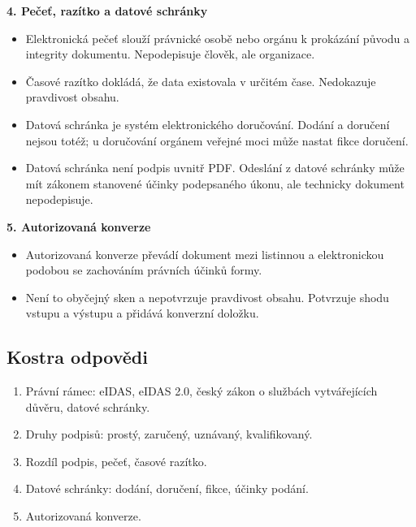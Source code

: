 \textbf{4. Pečeť, razítko a datové schránky}
\begin{itemize}
  \item Elektronická pečeť slouží právnické osobě nebo orgánu k prokázání původu a integrity dokumentu. Nepodepisuje člověk, ale organizace.
  \item Časové razítko dokládá, že data existovala v určitém čase. Nedokazuje pravdivost obsahu.
  \item Datová schránka je systém elektronického doručování. Dodání a doručení nejsou totéž; u doručování orgánem veřejné moci může nastat fikce doručení.
  \item Datová schránka není podpis uvnitř PDF. Odeslání z datové schránky může mít zákonem stanovené účinky podepsaného úkonu, ale technicky dokument nepodepisuje.
\end{itemize}

\textbf{5. Autorizovaná konverze}
\begin{itemize}
  \item Autorizovaná konverze převádí dokument mezi listinnou a elektronickou podobou se zachováním právních účinků formy.
  \item Není to obyčejný sken a nepotvrzuje pravdivost obsahu. Potvrzuje shodu vstupu a výstupu a přidává konverzní doložku.
\end{itemize}

\subsection*{Kostra odpovědi}
\begin{enumerate}
  \item Právní rámec: eIDAS, eIDAS 2.0, český zákon o službách vytvářejících důvěru, datové schránky.
  \item Druhy podpisů: prostý, zaručený, uznávaný, kvalifikovaný.
  \item Rozdíl podpis, pečeť, časové razítko.
  \item Datové schránky: dodání, doručení, fikce, účinky podání.
  \item Autorizovaná konverze.
\end{enumerate}

